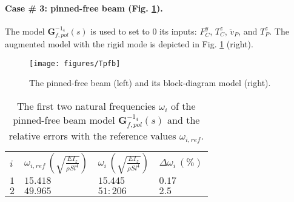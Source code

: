 \paragraph{Case \# 3: pinned-free beam (Fig. \ref{fig:Tpf}).} The model $\mathbf{G}_{f,pol}^{-1_{4}}(s)$ is used to set to $0$ its inputs: $F^y_C$, $T^z_C$, $\ddot{v}_P$, and $T^z_P$. The augmented model with the rigid mode is depicted in Fig. \ref{fig:Tpf} (right).
\begin{figure}[htbp!]
  \texttt{[image: figures/Tpfb]}
\caption{The pinned-free beam (left) and its block-diagram model (right).}
\label{fig:Tpf} 
\end{figure}
\begin{table}[htbp!]
\caption{The first two natural frequencies $\omega_i$ of the pinned-free beam model $\mathbf{G}_{f,pol}^{-1_{4}}(s)$ and the relative errors with the reference values $\omega_{i,ref}$.}
\label{tab:Tpf}       %
\begin{tabular}{llll}
\hline\noalign{\smallskip}
  $i$ & $\omega_{i,ref}\,\left(\sqrt{\frac{EI_z}{\rho S l^4}}\right)$ &  $\omega_i\,\left(\sqrt{\frac{EI_z}{\rho S l^4}}\right)$ &  $\Delta \omega_i\,(\%)$ \\
\noalign{\smallskip}\hline\noalign{\smallskip}
$1$ & $15.418$ & $15.445$  & $0.17$ \\ 
$2$ & $49.965$ & $51:206$ & $2.5$ \\
\hline
\end{tabular}
\end{table}


\FloatBarrier
